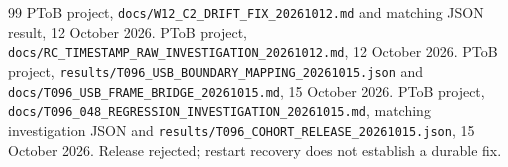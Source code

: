 \documentclass[11pt,letterpaper]{article}
\newcommand{\code}[1]{\texttt{#1}}
\begin{document}
\begin{thebibliography}{99}
 PToB project, \code{docs/W12\_C2\_DRIFT\_FIX\_20261012.md} and matching JSON result, 12 October 2026.
 PToB project, \code{docs/RC\_TIMESTAMP\_RAW\_INVESTIGATION\_20261012.md}, 12 October 2026.
 PToB project, \code{results/T096\_USB\_BOUNDARY\_MAPPING\_20261015.json} and \code{docs/T096\_USB\_FRAME\_BRIDGE\_20261015.md}, 15 October 2026.
 PToB project, \code{docs/T096\_048\_REGRESSION\_INVESTIGATION\_20261015.md}, matching investigation JSON and \code{results/T096\_COHORT\_RELEASE\_20261015.json}, 15 October 2026. Release rejected; restart recovery does not establish a durable fix.
\end{thebibliography}
\end{document}
